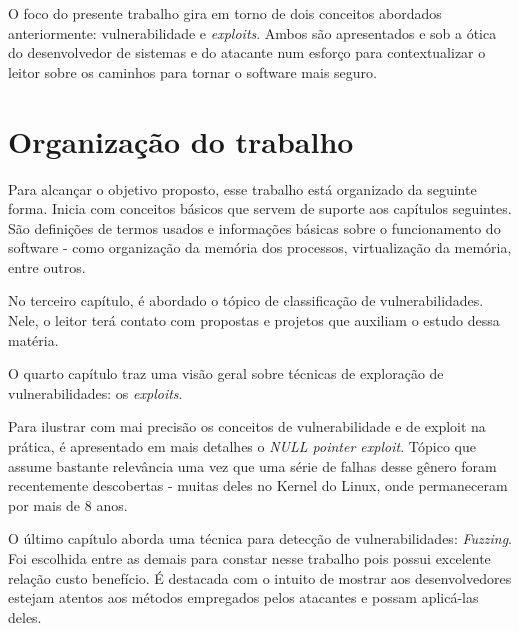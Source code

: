 	
	O foco do presente trabalho gira em torno de dois conceitos abordados anteriormente:
	vulnerabilidade e \textsl{exploits}. Ambos são apresentados e sob a ótica
	do desenvolvedor de sistemas e do atacante num esforço para contextualizar o leitor
	sobre os caminhos para tornar o software mais seguro.
	
	
	\section{Organização do trabalho}
		Para alcançar o objetivo proposto, esse trabalho está organizado da seguinte forma.
		Inicia com conceitos básicos que servem de suporte aos capítulos seguintes. São
		definições de termos usados e informações básicas sobre o funcionamento do software - como
		organização da memória dos processos, virtualização da memória, entre outros.

		No terceiro capítulo, é abordado o tópico de classificação de vulnerabilidades.
		Nele, o leitor terá contato com propostas e projetos que auxiliam o estudo dessa matéria.


		O quarto capítulo traz uma visão geral sobre técnicas de exploração de vulnerabilidades: os
		\textsl{exploits}.

		Para ilustrar com mai precisão os conceitos de vulnerabilidade e de exploit na prática,
		é apresentado em mais detalhes o \textsl{NULL pointer exploit}. Tópico que assume
		bastante relevância uma vez que uma série de falhas desse gênero foram recentemente
		descobertas - muitas deles no Kernel do Linux, onde permaneceram por mais de 8 anos.

		O último capítulo aborda uma técnica para detecção de vulnerabilidades: \textsl{Fuzzing}.
		Foi escolhida entre as demais para constar nesse trabalho pois possui excelente relação
		custo benefício. É destacada com o intuito de mostrar aos desenvolvedores estejam
		atentos aos métodos empregados pelos atacantes e possam aplicá-las deles.
		
		

		

		

